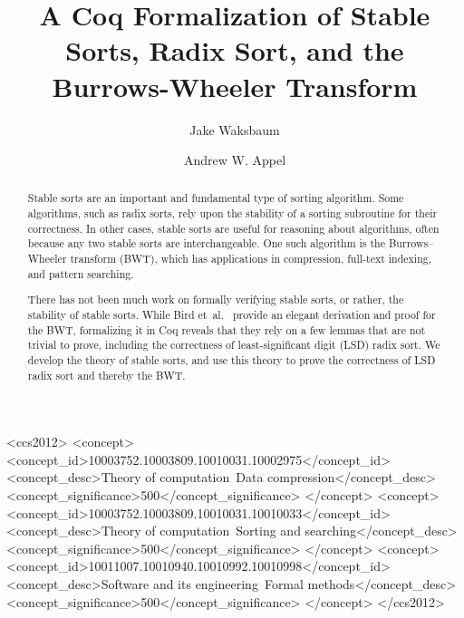 \documentclass[sigplan,10pt,anonymous,review]{thesis}
\begin{document}
\title[Coq Formalization of Stable Sorts, Radix Sort, and BWT]{A Coq
  Formalization of Stable Sorts, Radix Sort, and the Burrows-Wheeler
  Transform}

\author{Jake Waksbaum}

\author{Andrew W. Appel}

\begin{abstract}
Stable sorts are an important and fundamental type of sorting
algorithm. Some algorithms, such as radix sorts, rely upon the
stability of a sorting subroutine for their correctness. In other
cases, stable sorts are useful for reasoning about algorithms, often
because any two stable sorts are interchangeable. One such algorithm
is the Burrows--Wheeler transform (BWT), which has applications in
compression, full-text indexing, and pattern searching.

There has not been much work on formally verifying stable sorts, or
rather, the stability of stable sorts. While Bird
et~al.\ \cite{birdmu,pearls} provide an elegant derivation and proof
for the BWT, formalizing it in Coq reveals that they rely on a few
lemmas that are not trivial to prove, including the correctness of
least-significant digit (LSD) radix sort. We develop the theory of
stable sorts, and use this theory to prove the correctness of LSD
radix sort and thereby the BWT.
\end{abstract}

\begin{CCSXML} <ccs2012>
<concept>
<concept_id>10003752.10003809.10010031.10002975</concept_id>
<concept_desc>Theory of computation~Data compression</concept_desc>
<concept_significance>500</concept_significance>
</concept>
<concept>
<concept_id>10003752.10003809.10010031.10010033</concept_id>
<concept_desc>Theory of computation~Sorting and searching</concept_desc>
<concept_significance>500</concept_significance>
</concept>
<concept>
<concept_id>10011007.10010940.10010992.10010998</concept_id>
<concept_desc>Software and its engineering~Formal methods</concept_desc>
<concept_significance>500</concept_significance>
</concept>
</ccs2012>
\end{CCSXML}
\end{document}
